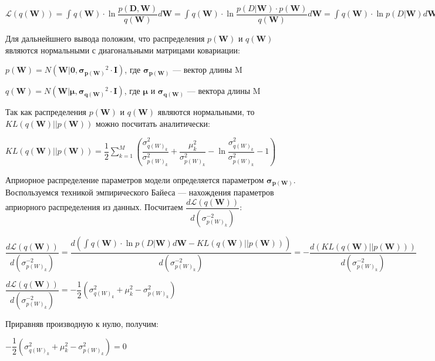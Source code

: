 \documentclass{article}
\begin{document}
$
\mathcal{L}(q(\mathbf{W})) =
\int_{}{} q(\mathbf{W}) \cdot \ln{\dfrac{p(\mathbf{D}, \mathbf{W})}{q(\mathbf{W})}} d\mathbf{W} =
\int_{}{} q(\mathbf{W}) \cdot \ln{\dfrac{p(D | \mathbf{W}) \cdot p(\mathbf{W})}{q(\mathbf{W})}} d\mathbf{W} =
\int_{}{} q(\mathbf{W}) \cdot \ln{p(D | \mathbf{W})} d\mathbf{W} - \int_{}{} q(\mathbf{W}) \cdot \ln{\dfrac{q(\mathbf{W})}{p(\mathbf{W})}} =
\int_{}{} q(\mathbf{W}) \cdot \ln{p(D | \mathbf{W})} d\mathbf{W} - KL(q(\mathbf{W}) || p(\mathbf{W}))
$

Для дальнейшнего вывода положим, что распределения $p(\mathbf{W})$ и $q(\mathbf{W})$ являются нормальными с диагональными матрицами ковариации:

$p(\mathbf{W}) = N(\mathbf{W} | \mathbf{0}, \pmb{\sigma_{p(\mathbf{W})}}^{2} \cdot \mathbf{I})$, где $\pmb{\sigma_{p(\mathbf{W})}}$ — вектор длины M

$q(\mathbf{W}) = N(\mathbf{W} | \pmb{\mu}, \pmb{\sigma_{q(\mathbf{W})}}^{2} \cdot \mathbf{I})$, где $\pmb{\mu}$ и $\pmb{\sigma_{q(\mathbf{W})}}$ — вектора длины M

Так как распределения $p(\mathbf{W})$ и $q(\mathbf{W})$ являются нормальными, то $KL(q(\mathbf{W}) || p(\mathbf{W}))$ можно посчитать аналитически:

$
KL(q(\mathbf{W}) || p(\mathbf{W})) =
\dfrac{1}{2}\sum_{k=1}^{M}(\dfrac{\sigma_{{q(W)_{k}}}^2}{\sigma_{{p(W)_{k}}}^2} + \dfrac{\mu_{k}^2}{\sigma_{{p(W)_{k}}}^2} - \ln{\dfrac{\sigma_{{q(W)_{k}}}^2}{\sigma_{{p(W)_{k}}}^2}} - 1)
$

Априорное распределение параметров модели определяется параметром $\pmb{\sigma_{p(\mathbf{W})}}$. Воспользуемся техникой эмпирического Байеса — нахождения параметров априорного распределения из данных. Посчитаем
$\dfrac{d\mathcal{L}(q(\mathbf{W}))}{d ({\sigma_{p(W)_{k}}^{-2}})}$:

$
\dfrac{d\mathcal{L}(q(\mathbf{W}))}{d ({\sigma_{p(W)_{k}}^{-2}})} =
\dfrac{d (\int_{}{} q(\mathbf{W}) \cdot \ln{p(D | \mathbf{W})} d\mathbf{W} - KL(q(\mathbf{W}) || p(\mathbf{W})))}{d ({\sigma_{p(W)_{k}}^{-2}})} =
- \dfrac{d (KL(q(\mathbf{W}) || p(\mathbf{W})))}{d ({\sigma_{p(W)_{k}}^{-2}})}$

$
\dfrac{d\mathcal{L}(q(\mathbf{W}))}{d ({\sigma_{p(W)_{k}}^{-2}})} =
-\dfrac{1}{2}(\sigma_{{q(W)_{k}}}^2 + \mu_{k}^2 - \sigma_{{p(W)_{k}}}^2)
$

Приравняв производную к нулю, получим:

$
-\dfrac{1}{2}(\sigma_{{q(W)_{k}}}^2 + \mu_{k}^2 - \sigma_{{p(W)_{k}}}^2) = 0
$
\end{document}
